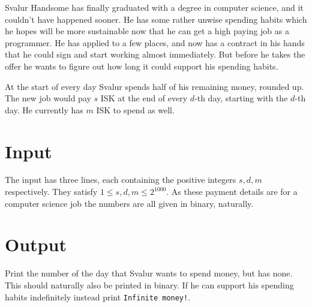 
Svalur Handsome has finally graduated with a degree in computer
science, and it couldn't have happened sooner. He has some
rather unwise spending habits which he hopes will be more
sustainable now that he can get a high paying job as a programmer.
He has applied to a few places, and now has a contract in his
hands that he could sign and start working almost immediately.
But before he takes the offer he wants to figure out
how long it could support his spending habits.

At the start of every day Svalur spends half of his remaining
money, rounded up. The new job would pay $s$ ISK at the end
of every $d$-th day, starting with the $d$-th day. 
He currently has $m$ ISK to spend as well.

\section*{Input}

The input has three lines, each containing the positive integers
$s, d, m$ respectively. They satisfy $1 \leq s, d, m \leq 
2^{1000}$. As these payment details are for a computer science
job the numbers are all given in binary, naturally.

\section*{Output}

Print the number of the day that Svalur wants to spend money, but
has none. This should naturally also be printed in binary. If he
can support his spending habits indefinitely instead print
\texttt{Infinite money!}.
